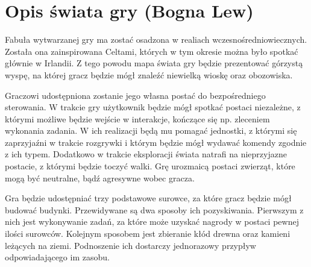 \section{Opis świata gry (Bogna Lew)}
Fabuła wytwarzanej gry ma zostać osadzona w realiach wczesnośredniowiecznych. Została ona zainspirowana Celtami, których
w tym okresie można było spotkać głównie w Irlandii. Z tego powodu mapa świata gry będzie prezentować górzystą wyspę, na
której gracz będzie mógł znaleźć niewielką wioskę oraz obozowiska.

Graczowi udostępniona zostanie jego własna postać do bezpośredniego sterowania. W trakcie gry użytkownik będzie
mógł spotkać postaci niezależne, z którymi możliwe będzie wejście w interakcje, kończące się np. zleceniem wykonania zadania.
W ich realizacji będą mu pomagać jednostki, z którymi się zaprzyjaźni w trakcie rozgrywki i którym będzie mógł wydawać
komendy zgodnie z ich typem. Dodatkowo w trakcie eksploracji świata natrafi na nieprzyjazne postacie, z którymi
będzie toczyć walki. Grę urozmaicą postaci zwierząt, które mogą być neutralne, bądź agresywne wobec gracza.

Gra będzie udostępniać trzy podstawowe surowce, za które gracz będzie mógł budować budynki. Przewidywane są dwa sposoby
ich pozyskiwania. Pierwszym z nich jest wykonywanie zadań, za które może uzyskać nagrody w postaci pewnej ilości
surowców. Kolejnym sposobem jest zbieranie kłód drewna oraz kamieni leżących na ziemi. Podnoszenie ich dostarczy
jednorazowy przypływ odpowiadającego im zasobu.
